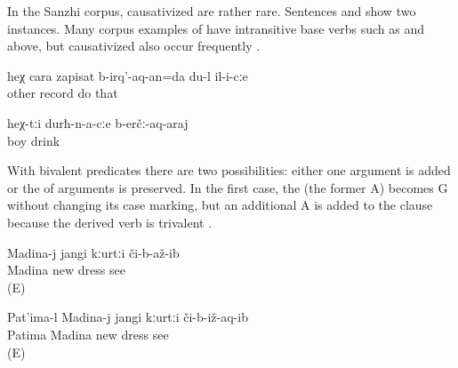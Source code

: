 In the Sanzhi corpus, causativized  are rather rare. Sentences  and  show two instances. Many corpus examples of  have intransitive base verbs such as  and  above, but causativized  also occur frequently .
%
\begin{exe}
	\ex	\label{ex:‎‎If it is like this, I will also make him record that other (story)}
	\gll	heχ	cara	zapisat	b-irq'-aq-an=da	du-l	il-i-cːe\\
			other	record	do	 that\\
	\glt	{}

	\ex	\label{ex:to make the boys drink}
	\gll	heχ-tːi	durħ-n-a-cːe	b-erčː-aq-araj\\
			boy	drink\\
	\glt	{}
\end{exe}

With bivalent  predicates there are two possibilities: either one argument is added or the  of arguments is preserved. In the first case, the  (the former A) becomes G without changing its case marking, but an additional A is added to the clause because the derived verb is trivalent . 
%
\begin{exe}
	\ex	\label{ex:Madina, Patima, and the dress@59}
	\begin{xlist}
		\ex	\label{ex:Madina saw a new dress@59a}
		\gll	Madina-j	jangi	kːurtːi	či-b-až-ib\\
			Madina	new	dress	see\\
		\glt	{} (E)

		\ex	\label{ex:Patima showed Madina a new dress@59b}
		\gll	Pat'ima-l	Madina-j	jangi	kːurtːi	či-b-iž-aq-ib\\
			Patima	Madina	new	dress	see\\
		\glt	{} (E)
	\end{xlist}
\end{exe}

